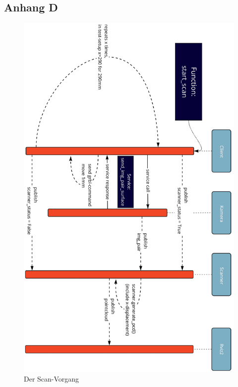 \documentclass[	12pt,
				a4paper,
				bibliography=totoc,
				listof=totoc,
				index=totoc,
				twoside,
				headsepline,
				footsepline,
				ngerman]{scrartcl}
\begin{document}
\begin{appendix}
		\subsection{Anhang D}\label{anhang-d}
			\begin{figure}[h!]
				\centering
				\includegraphics[width=0.75\linewidth]{img/anhang/vorgang_scanablauf.jpg}
				\caption{Der Scan-Vorgang}
				\label{fig:vorgang_scan}
			\end{figure}
		\newpage

\end{appendix}
\end{document}

